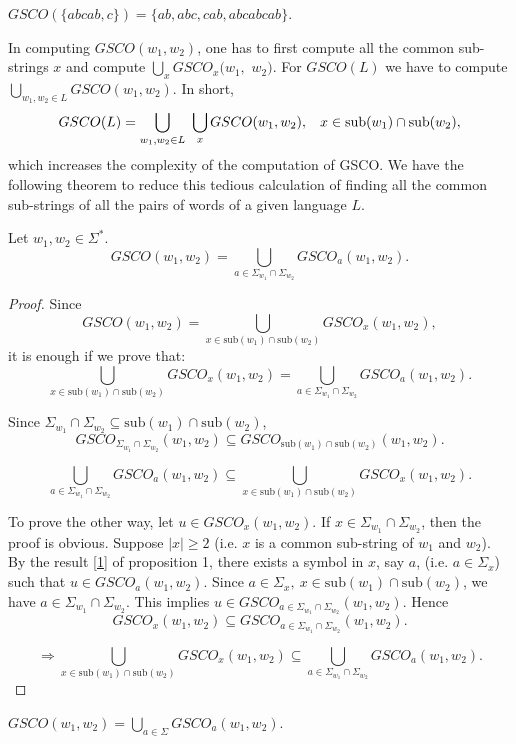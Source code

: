\documentclass{llncs}
\newcommand{\sg}{\Sigma}
\newcommand{\sub}{\mathrm{sub}}
\begin{document}
\begin{example}
$GSCO(\{abcab,c\})=\{ab,abc,cab,abcabcab\}$.
\end{example}


\par In computing $GSCO (w_1,w_2)$, one has to first compute all the common sub-strings $x$
and compute $\bigcup_xGSCO_x(w_1,$ $w_2)$. For $GSCO(L)$  we have to
compute $\bigcup_{w_1,w_2\in L}GSCO(w_1,w_2)$. In short,
\[GSCO(L)=  \bigcup_{w_1,w_2\in L}~\bigcup_xGSCO(w_1,w_2),\hspace{3mm}x\in
\sub(w_1)\cap\sub(w_2)
,\]
which increases the complexity of the computation of GSCO. We
have the following theorem to reduce this tedious calculation of
finding all the common sub-strings of all the pairs of  words of a
given language $L$.
\begin{theorem}
Let $w_1,w_2\in\sg^*$.
\[GSCO(w_1,w_2)=\bigcup_{a\in\sg_{w_1}\cap\sg_{w_2}}GSCO_a(w_1,w_2).\]
\end{theorem}
\begin{proof}
Since
\[GSCO(w_1,w_2)= \bigcup_{x\in\sub(w_1)\cap\sub(w_2)} GSCO_x(w_1,w_2),\]
it is enough if we prove that:
\[ \bigcup_{x\in\sub(w_1)\cap\sub(w_2)} GSCO_x(w_1,w_2)=\bigcup_{a\in\sg_{w_1}
\cap\sg_{w_2}}GSCO_a(w_1,w_2).\]
\par Since $\sg_{w_1}\cap\sg_{w_2}\subseteq\sub(w_1)\cap\sub(w_2)$,
\[GSCO_{\sg_{w_1}\cap\sg_{w_2}}(w_1,w_2)\subseteq
GSCO_{\sub(w_1)\cap\sub(w_2)}(w_1,w_2).\]


\[ \bigcup_{a\in\sg_{w_1}\cap\sg_{w_2}} GSCO_a(w_1,w_2)
\subseteq\bigcup_{x\in\sub(w_1)\cap\sub(w_2)}GSCO_x (w_1,w_2).\]

\par To prove the other way, let  $u\in GSCO_x(w_1,w_2)$. If
$x\in\sg_{w_1}\cap\sg_{w_2}$, then the proof is obvious. Suppose
$|x|\geq2$ (i.e. $x$ is a common sub-string  of $w_1$ and $w_2$). By
the result \ref{1} of proposition 1,  there exists a symbol in $x$,
say $a$, (i.e. $a\in\sg_x$) such that $u\in GSCO_a(w_1,w_2)$. Since
$a\in\sg_x, ~x\in\sub(w_1)\cap\sub(w_2)$, we have
$a\in\sg_{w_1}\cap\sg_{w_2}$. This implies $u\in
GSCO_{a\in\sg_{w_1}\cap\sg_{w_2}}(w_1,w_2)$. Hence
\[GSCO_x(w_1,w_2)\subseteq GSCO_{a\in\sg_{w_1}\cap\sg_{w_2}}(w_1,w_2).\]

\[\Rightarrow \bigcup_{x\in\sub(w_1)\cap\sub(w_2)}GSCO_x(w_1,w_2)
\subseteq \bigcup_{a\in\sg_{w_1}\cap \sg_{w_2}}GSCO_a(w_1,w_2).\]
\end{proof}
\begin{corollary}\label{c1}
$GSCO(w_1,w_2)=\bigcup_{a\in\sg}GSCO_a(w_1,w_2)$.
\end{corollary}
\end{document}
